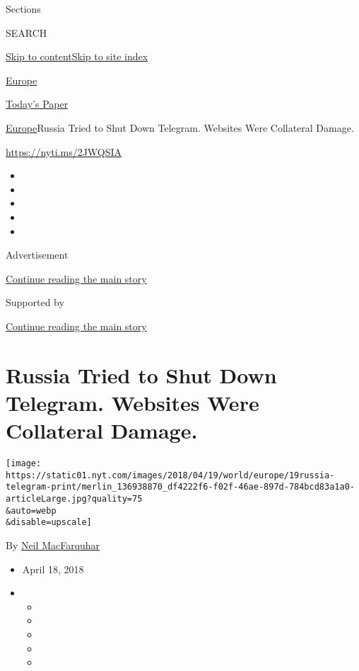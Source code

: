 Sections

SEARCH

\protect\hyperlink{site-content}{Skip to
content}\protect\hyperlink{site-index}{Skip to site index}

\href{https://www.nytimes.com/section/world/europe}{Europe}

\href{https://myaccount.nytimes.com/auth/login?response_type=cookie\&client_id=vi}{}

\href{https://www.nytimes.com/section/todayspaper}{Today's Paper}

\href{/section/world/europe}{Europe}\textbar{}Russia Tried to Shut Down
Telegram. Websites Were Collateral Damage.

\href{https://nyti.ms/2JWQSIA}{https://nyti.ms/2JWQSIA}

\begin{itemize}
\item
\item
\item
\item
\item
\end{itemize}

Advertisement

\protect\hyperlink{after-top}{Continue reading the main story}

Supported by

\protect\hyperlink{after-sponsor}{Continue reading the main story}

\hypertarget{russia-tried-to-shut-down-telegram-websites-were-collateral-damage}{%
\section{Russia Tried to Shut Down Telegram. Websites Were Collateral
Damage.}\label{russia-tried-to-shut-down-telegram-websites-were-collateral-damage}}

\texttt{[image: https://static01.nyt.com/images/2018/04/19/world/europe/19russia-telegram-print/merlin\_136938870\_df4222f6-f02f-46ae-897d-784bcd83a1a0-articleLarge.jpg?quality=75\\\&auto=webp\\\&disable=upscale]}

By \href{https://www.nytimes.com/by/neil-macfarquhar}{Neil MacFarquhar}

\begin{itemize}
\item
  April 18, 2018
\item
  \begin{itemize}
  \item
  \item
  \item
  \item
  \item
  \end{itemize}
\end{itemize}

